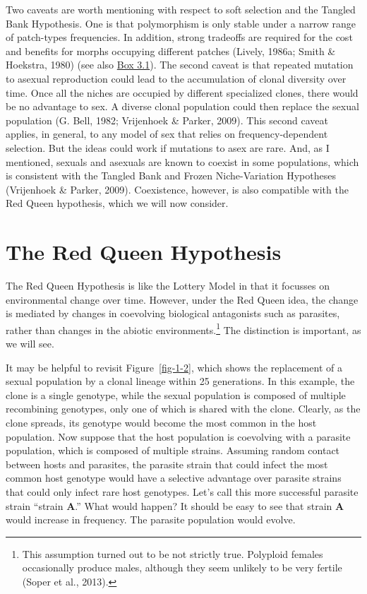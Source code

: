 \documentclass[
  letterpaper,
]{book}
\begin{document}
Two caveats are worth mentioning with respect to soft selection and the
Tangled Bank Hypothesis. One is that polymorphism is only stable under a
narrow range of patch-types frequencies. In addition, strong tradeoffs
are required for the cost and benefits for morphs occupying different
patches (Lively, 1986a; Smith \& Hoekstra, 1980) (see also
\href{https://iulibscholcomm.github.io/through-the-looking-glass/eco-hyp-cont.html\#callout-4}{Box
3.1}). The second caveat is that repeated mutation to asexual
reproduction could lead to the accumulation of clonal diversity over
time. Once all the niches are occupied by different specialized clones,
there would be no advantage to sex. A diverse clonal population could
then replace the sexual population (G. Bell, 1982; Vrijenhoek \& Parker,
2009). This second caveat applies, in general, to any model of sex that
relies on frequency-dependent selection. But the ideas could work if
mutations to asex are rare. And, as I mentioned, sexuals and asexuals
are known to coexist in some populations, which is consistent with the
Tangled Bank and Frozen Niche-Variation Hypotheses (Vrijenhoek \&
Parker, 2009). Coexistence, however, is also compatible with the Red
Queen hypothesis, which we will now consider.

\hypertarget{the-red-queen-hypothesis}{%
\section{The Red Queen Hypothesis}\label{the-red-queen-hypothesis}}

The Red Queen Hypothesis is like the Lottery Model in that it focusses
on environmental change over time. However, under the Red Queen idea,
the change is mediated by changes in coevolving biological antagonists
such as parasites, rather than changes in the abiotic
environments.\footnote{This assumption turned out to be not strictly
  true. Polyploid females occasionally produce males, although they seem
  unlikely to be very fertile (Soper et al., 2013).} The distinction is
important, as we will see.

It may be helpful to revisit Figure~\ref{fig-1-2}, which shows the
replacement of a sexual population by a clonal lineage within 25
generations. In this example, the clone is a single genotype, while the
sexual population is composed of multiple recombining genotypes, only
one of which is shared with the clone. Clearly, as the clone spreads,
its genotype would become the most common in the host population. Now
suppose that the host population is coevolving with a parasite
population, which is composed of multiple strains. Assuming random
contact between hosts and parasites, the parasite strain that could
infect the most common host genotype would have a selective advantage
over parasite strains that could only infect rare host genotypes. Let's
call this more successful parasite strain ``strain \textbf{A}.'' What
would happen? It should be easy to see that strain \textbf{A} would
increase in frequency. The parasite population would evolve.
\end{document}
